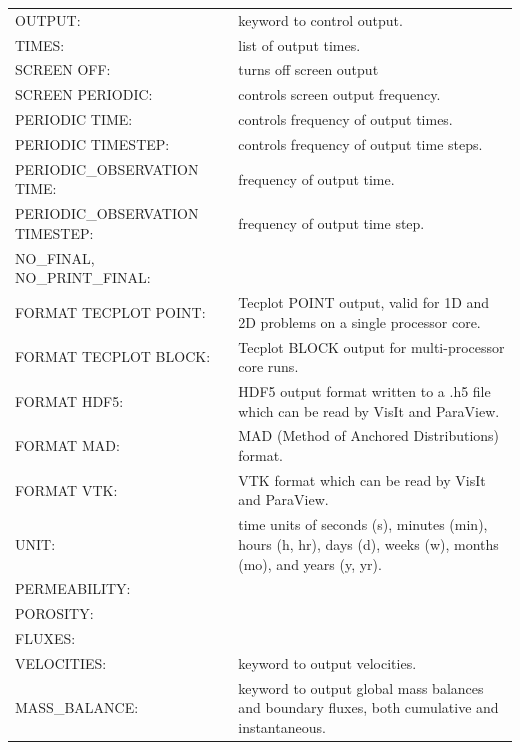 
\begin{center}
\begin{tabularx}{\linewidth}{lX}
OUTPUT: & keyword to control output.\\
TIMES: & list of output times.\\
SCREEN OFF: & turns off screen output\\
SCREEN PERIODIC: & controls screen output frequency.\\
PERIODIC TIME: & controls frequency of output times.\\
PERIODIC TIMESTEP: & controls frequency of output time steps.\\
PERIODIC\_OBSERVATION TIME: & frequency of output time.\\
PERIODIC\_OBSERVATION TIMESTEP: & frequency of output time step.\\
NO\_FINAL, NO\_PRINT\_FINAL: & \\
FORMAT TECPLOT POINT: & Tecplot POINT output, valid for 1D and 2D problems on a single processor core.\\
FORMAT TECPLOT BLOCK: & Tecplot BLOCK output for multi-processor core runs.\\
FORMAT HDF5: & HDF5 output format written to a .h5 file which can be read by VisIt and ParaView.\\
FORMAT MAD: & MAD (Method of Anchored Distributions) format.\\
FORMAT VTK: & VTK format which can be read by VisIt and ParaView.\\
UNIT: & time units of seconds (s), minutes (min), hours (h, hr), days (d), weeks (w), months (mo), and years (y, yr).\\
PERMEABILITY: & \\
POROSITY: & \\
FLUXES: & \\
VELOCITIES: & keyword to output velocities.\\
MASS\_BALANCE: & keyword to output global mass balances and boundary fluxes, both cumulative and instantaneous.
\end{tabularx}
\end{center}

